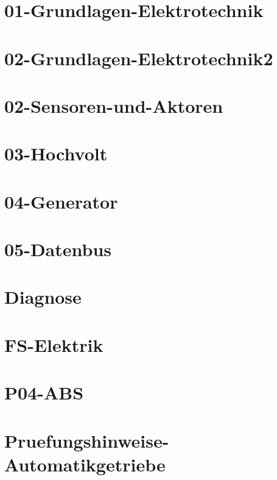 



\chapter{01-Grundlagen-Elektrotechnik}
%
\chapter{02-Grundlagen-Elektrotechnik2}
%
\chapter{02-Sensoren-und-Aktoren}
%
\chapter{03-Hochvolt}
%
\chapter{04-Generator}
%
\chapter{05-Datenbus}
%
\chapter{Diagnose}
%
\chapter{FS-Elektrik}
%
\chapter{P04-ABS}
%
\chapter{Pruefungshinweise-Automatikgetriebe}
%

